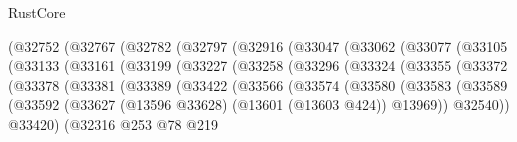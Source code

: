 \begin{lexlean}{RustCore}
\begin{coremodule}
                        (@32752
                          (@32767
                            (@32782
                              (@32797
                                (@32916
                                  (@33047
                                    (@33062
                                      (@33077
                                        (@33105
                                          (@33133
                                            (@33161
                                              (@33199
                                                (@33227
                                                  (@33258
                                                    (@33296
                                                      (@33324
                                                        (@33355
                                                          (@33372
                                                            (@33378
                                                              (@33381
                                                                (@33389
                                                                  (@33422
                                                                    (@33566
                                                                      (@33574
                                                                        (@33580
                                                                          (@33583
                                                                            (@33589
                                                                              (@33592
                                                                                (@33627
                                                                                  (@13596 @33628)
                                                                                  (@13601
                                                                                    (@13603 @424))
                                                                                  @13969))
                                                                              @32540))
                                                                          @33420)
                                                                        (@32316
                                                                          @253
                                                                          @78
                                                                          @219

\end{coremodule}
\end{lexlean}
